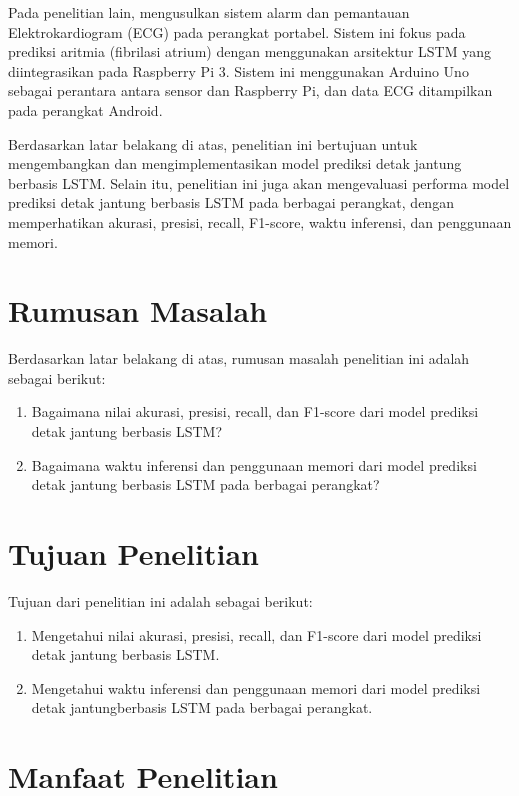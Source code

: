 Pada penelitian lain, \textcite{ahsanuzzamanLowCostPortable2020} mengusulkan sistem alarm dan pemantauan Elektrokardiogram (ECG) pada perangkat portabel. Sistem ini fokus pada prediksi aritmia (fibrilasi atrium) dengan menggunakan arsitektur LSTM yang diintegrasikan pada Raspberry Pi 3. Sistem ini menggunakan Arduino Uno sebagai perantara antara sensor dan Raspberry Pi, dan data ECG ditampilkan pada perangkat Android.

Berdasarkan latar belakang di atas, penelitian ini bertujuan untuk mengembangkan dan mengimplementasikan model prediksi detak jantung berbasis LSTM. Selain itu, penelitian ini juga akan mengevaluasi performa model prediksi detak jantung berbasis LSTM pada berbagai perangkat, dengan memperhatikan akurasi, presisi, recall, F1-score, waktu inferensi, dan penggunaan memori.

\section{Rumusan Masalah}

Berdasarkan latar belakang di atas, rumusan masalah penelitian ini adalah sebagai berikut:

\begin{enumerate}
  \item Bagaimana nilai akurasi, presisi, recall, dan F1-score dari model prediksi detak jantung berbasis LSTM?
  \item Bagaimana waktu inferensi dan penggunaan memori dari model prediksi detak jantung berbasis LSTM pada berbagai perangkat?
\end{enumerate}

\section{Tujuan Penelitian}

Tujuan dari penelitian ini adalah sebagai berikut:

\begin{enumerate}
  \item Mengetahui nilai akurasi, presisi, recall, dan F1-score dari model prediksi detak jantung berbasis LSTM.
  \item Mengetahui waktu inferensi dan penggunaan memori dari model prediksi detak jantungberbasis LSTM pada berbagai perangkat.
\end{enumerate}

\section{Manfaat Penelitian}

